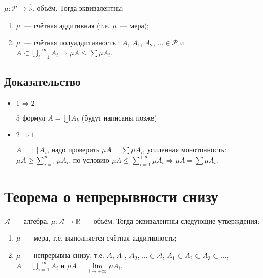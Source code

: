\documentclass{article}
\begin{document}
        $\mu : \mathcal{P} \rightarrow \overline{\mathbb{R}}$, объём. Тогда эквивалентны:
        
        \begin{enumerate}
        
            \item $\mu$~--- счётная аддитивная (т.е. $\mu$~--- мера);
            
            \item $\mu$~--- счётная полуаддитивность : $A$, $A_1$, $A_2$, $\ldots \in \mathcal{P}$ и $A \subset \bigcup\limits^{+\infty}_{i = 1} A_i \Rightarrow \mu A \leq \sum \mu A_i$.
            
        \end{enumerate}
        
        \subsection{Доказательство}
        
            \begin{itemize}
            
                \item $1 \Rightarrow 2$
                
                    $5$ формул $A = \bigcup A_k$ (будут написаны позже)
                    
                \item $2 \Rightarrow 1$
                
                    $A = \bigsqcup A_i$, надо проверить $\mu A = \sum \mu A_i$, усиленная монотонность: $\mu A \geq \sum\limits^n_{i = 1} \mu A_i$, по условию $\mu A \leq \sum\limits^{+\infty}_{i = 1} \mu A_i \Rightarrow \mu A = \sum \mu A_i$.
                        
            \end{itemize}
            
    \newpage
    
    \section{Теорема о непрерывности снизу}
    
        $\mathcal{A}$~--- алгебра, $\mu : \mathcal{A} \rightarrow \overline{\mathbb{R}}$~--- объём. Тогда эквивалентны следующие утверждения:
        
        \begin{enumerate}
        
            \item $\mu$~--- мера, т.е. выполняется счётная аддитивность;
            
            \item $\mu$~--- непрерывна снизу, т.е. $A$, $A_1$, $A_2$, $\ldots \in \mathcal{A}$, $A_1 \subset A_2 \subset A_3 \subset \ldots$, $A = \bigcup\limits^{+\infty}_{i = 1} A_i$ и $\mu A = \lim\limits_{i \rightarrow +\infty} \mu A_i$.
            
        \end{enumerate}
        
\end{document}
